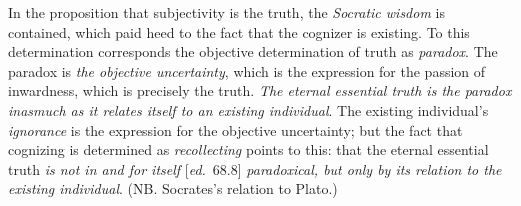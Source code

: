 \documentclass[12pt,a4paper,openany]{book}
\newcommand{\ed}[1]{{\small[\textit{ed.}\ #1]}}
\begin{document}
In the proposition that subjectivity is the truth, the \emph{Socratic
wisdom} is contained, which paid heed to the fact that the cognizer is existing.
To this determination corresponds the objective determination
of truth as \emph{paradox}. The paradox is \emph{the objective uncertainty}, which is
the expression for the passion of inwardness, which is precisely the truth.
\emph{The eternal essential truth is the paradox inasmuch as it relates itself to an existing individual}.
The existing individual's \emph{ignorance} is the expression for the objective
uncertainty; but the fact that cognizing is determined as \emph{recollecting} points
to this: that the eternal essential truth \emph{is not in and for itself} \ed{68.8} \emph{paradoxical,
but only by its relation to the existing individual}. (NB. Socrates's relation to
Plato.)
\end{document}

